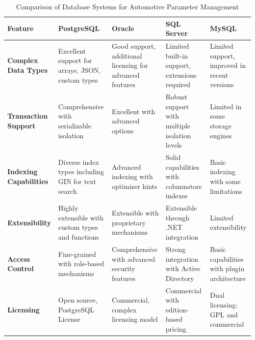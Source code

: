 \begin{table}[htbp]
\centering
\caption{Comparison of Database Systems for Automotive Parameter Management}
\label{tab:database-comparison}
\begin{tabular}{|p{2.5cm}|p{2.5cm}|p{2.5cm}|p{2.5cm}|p{2.5cm}|}
\hline
\textbf{Feature} & \textbf{PostgreSQL} & \textbf{Oracle} & \textbf{SQL Server} & \textbf{MySQL} \\
\hline
\textbf{Complex Data Types} & 
Excellent support for arrays, JSON, custom types \cite{obe2017postgresql} & 
Good support, additional licensing for advanced features \cite{agarwaloracle} & 
Limited built-in support, extensions required \cite{ben2017mcsa} & 
Limited support, improved in recent versions \cite{williams2004web} \\
\hline
\textbf{Transaction Support} & 
Comprehensive with serializable isolation \cite{obe2017postgresql} & 
Excellent with advanced options \cite{agarwaloracle} & 
Robust support with multiple isolation levels \cite{ben2017mcsa} & 
Limited in some storage engines \cite{schwartz2012high} \\
\hline
\textbf{Indexing Capabilities} & 
Diverse index types including GIN for text search \cite{obe2017postgresql} & 
Advanced indexing with optimizer hints \cite{agarwaloracle} & 
Solid capabilities with columnstore indexes \cite{ben2017mcsa} & 
Basic indexing with some limitations \cite{schwartz2012high} \\
\hline
\textbf{Extensibility} & 
Highly extensible with custom types and functions \cite{obe2017postgresql} & 
Extensible with proprietary mechanisms \cite{agarwaloracle} & 
Extensible through .NET integration \cite{ben2017mcsa} & 
Limited extensibility \cite{williams2004web} \\
\hline
\textbf{Access Control} & 
Fine-grained with role-based mechanisms \cite{obe2017postgresql} & 
Comprehensive with advanced security features \cite{agarwaloracle} & 
Strong integration with Active Directory \cite{ben2017mcsa} & 
Basic capabilities with plugin architecture \cite{williams2004web} \\
\hline
\textbf{Licensing} & 
Open source, PostgreSQL License \cite{obe2017postgresql} & 
Commercial, complex licensing model \cite{agarwaloracle} & 
Commercial with edition-based pricing \cite{ben2017mcsa} & 
Dual licensing: GPL and commercial \cite{williams2004web} \\
\hline
\end{tabular}
\end{table}

